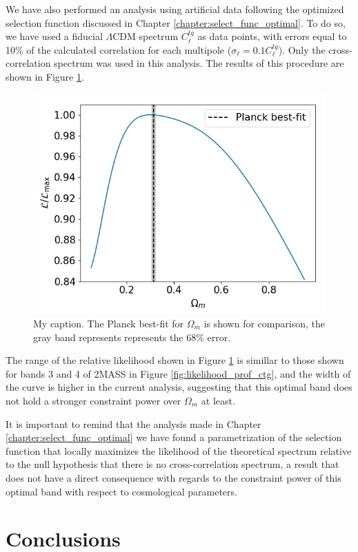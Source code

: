 \documentclass[openany,a4paper,12pt,oneside]{book}
\begin{document}
\begin{spacing}{1.5}
We have also performed an analysis using artificial data following the optimized selection function discussed in Chapter \ref{chapter:select_func_optimal}. To do so, we have used a fiducial $\Lambda$CDM spectrum $C_\ell^{tg}$ as data points, with errors equal to 10\% of the calculated correlation for each multipole ($\sigma_\ell=0.1C_\ell^{tg}$). Only the cross-correlation spectrum was used in this analysis. The results of this procedure are shown in Figure \ref{fig:likelihood_band_optimal}. %

\begin{figure}[!htb]
	\centering
	\includegraphics[width=.7\linewidth]{Imagens/profile_BestBand.png}
	\caption{My caption. The Planck best-fit for $\Omega_m$ is shown for comparison, the gray band represents represents the 68\% error.}
	\label{fig:likelihood_band_optimal}
\end{figure}

The range of the relative likelihood shown in Figure \ref{fig:likelihood_band_optimal} is simillar to those shown for bands 3 and 4 of 2MASS in Figure \ref{fig:likelihood_prof_ctg}, and the width of the curve is higher in the current analysis, suggesting that this optimal band does not hold a stronger constraint power over $\Omega_m$ at least. 

It is important to remind that the analysis made in Chapter \ref{chapter:select_func_optimal} we have found a parametrization of the selection function that locally maximizes the likelihood of the theoretical spectrum relative to the null hypothesis that there is no cross-correlation spectrum, a result that does not have a direct consequence with regards to the constraint power of this optimal band with respect to cosmological parameters. 

\chapter{Conclusions}


\end{spacing}
\end{document}
